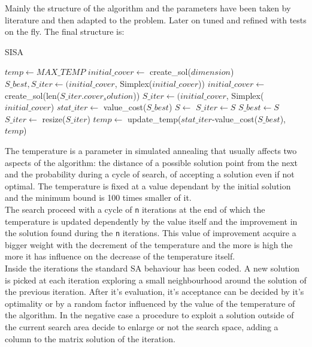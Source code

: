 ﻿\documentclass[a4paper]{article}
\begin{document}
Mainly the structure of the algorithm and the parameters have been taken by literature \cite{sa-structure} \cite{sa-params} and then adapted to the problem. Later on tuned and refined with tests on the fly. The final structure is:
            
\begin{algorithm}[H]
\caption{SISA}\label{euclid}
\begin{algorithmic}[1]
        \State $temp \gets MAX\_TEMP$
        \State $initial\_cover \gets $ create\_sol($dimension$) 
        \State $S\_best, S\_iter \gets (initial\_cover$, Simplex($initial\_cover$))
            \State $initial\_cover \gets $ create\_sol(len($S\_iter.cover_solution$))
            \State $S\_iter \gets (initial\_cover$, Simplex($initial\_cover$)
            \State $stat\_iter \gets$ value\_cost($S\_best$)
                \State $S \gets $
                    \State $S\_iter \gets S$
                        \State $S\_best \gets S$
                    \EndIf
                \Else
                    \State $S\_iter \gets $ resize($S\_iter$)
                \EndIf
            \EndFor
            \State $temp \gets$ update\_temp($stat\_iter$-value\_cost($S\_best$), $temp$)
        \EndWhile
    \EndProcedure
\end{algorithmic}
\end{algorithm}

The temperature is a parameter in simulated annealing that usually affects two aspects of the algorithm:
the distance of a possible solution point from the next and the probability during a cycle of search, of accepting a solution even if not optimal. The temperature is fixed at a value dependant by the initial solution and the minimum bound is 100 times smaller of it.\\
The search proceed with a cycle of \texttt{n} iterations at the end of which the temperature is updated dependently by the value itself and the improvement in the solution found during the \texttt{n} iterations. This value of improvement acquire a bigger weight with the decrement of the temperature and the more is high the more it has influence on the decrease of the temperature itself.\\
Inside the iterations the standard SA behaviour has been coded. A new solution is picked at each iteration exploring a small neighbourhood around the solution of the previous iteration. After it's evaluation, it's acceptance can be decided by it's optimality or by a random factor influenced by the value of the temperature of the algorithm. In the negative case a procedure to exploit a solution outside of the current search area decide to enlarge or not the search space, adding a column to the matrix solution of the iteration.
\end{document}
